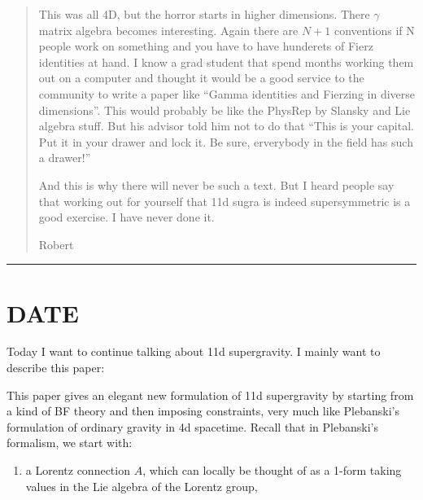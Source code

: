 \documentclass{article}
\def\tightlist{}
\renewcommand{\texttt}[1]{%
  \begingroup
  \ttfamily
  \begingroup\lccode`~=`/\lowercase{\endgroup\def~}{/\discretionary{}{}{}}%
  \begingroup\lccode`~=`[\lowercase{\endgroup\def~}{[\discretionary{}{}{}}%
  \begingroup\lccode`~=`.\lowercase{\endgroup\def~}{.\discretionary{}{}{}}%
  \catcode`/=\active\catcode`[=\active\catcode`.=\active
  \scantokens{#1\noexpand}%
  \endgroup
}
\begin{document}
\begin{quote}
This was all 4D, but the horror starts in higher dimensions. There
\(\gamma\) matrix algebra becomes interesting. Again there are \(N+1\)
conventions if N people work on something and you have to have hunderets
of Fierz identities at hand. I know a grad student that spend months
working them out on a computer and thought it would be a good service to
the community to write a paper like ``Gamma identities and Fierzing in
diverse dimensions''. This would probably be like the PhysRep by Slansky
and Lie algebra stuff. But his advisor told him not to do that ``This is
your capital. Put it in your drawer and lock it. Be sure, erverybody in
the field has such a drawer!''

And this is why there will never be such a text. But I heard people say
that working out for yourself that 11d sugra is indeed supersymmetric is
a good exercise. I have never done it.

Robert
\end{quote}

\begin{center}\rule{0.5\linewidth}{0.5pt}\end{center}
\hypertarget{week159}{%
\section{DATE}\label{week159}}

Today I want to continue talking about 11d supergravity. I mainly want
to describe this paper:


This paper gives an elegant new formulation of 11d supergravity by
starting from a kind of BF theory and then imposing constraints, very
much like Plebanski's formulation of ordinary gravity in 4d spacetime.
Recall that in Plebanski's formalism, we start with:

\begin{enumerate}
\def\labelenumi{\alph{enumi})}
\tightlist
\item
  a Lorentz connection \(A\), which can locally be thought of as a
  1-form taking values in the Lie algebra of the Lorentz group,
\end{enumerate}
\end{document}
